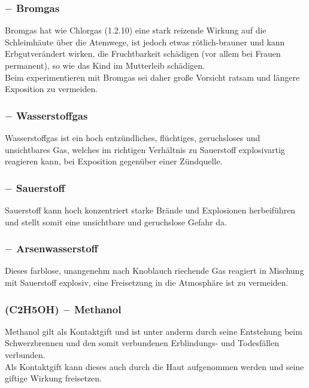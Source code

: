 \documentclass{article}
\begin{document}
\subsubsection{ $-$ Bromgas}
Bromgas hat wie Chlorgas (1.2.10) eine stark reizende Wirkung auf die Schleimhäute über die Atemwege, ist jedoch etwas rötlich-brauner und kann Erbgutverändert wirken, die Fruchtbarkeit schädigen (vor allem bei Frauen permanent), so wie das Kind im Mutterleib schädigen.\\
Beim experimentieren mit Bromgas sei daher große Vorsicht ratsam und längere Exposition zu vermeiden.\\

\subsubsection{ $-$ Wasserstoffgas}
Wasserstoffgas ist ein hoch entzündliches, flüchtiges, geruchsloses und unsichtbares Gas, welches im richtigen Verhältnis zu Sauerstoff explosivartig reagieren kann, bei Exposition gegenüber einer Zündquelle.\\

\subsubsection{ $-$ Sauerstoff}
Sauerstoff kann hoch konzentriert starke Brände und Explosionen herbeiführen und stellt somit eine unsichtbare und geruchslose Gefahr da.\\

\subsubsection{ $-$ Arsenwasserstoff}
Dieses farblose, unangenehm nach Knoblauch riechende Gas reagiert in Mischung mit Sauerstoff explosiv, eine Freisetzung in die Atmosphäre ist zu vermeiden.\\

\subsubsection{\ce(C2H5OH) $-$ Methanol}
Methanol gilt als Kontaktgift und ist unter anderm durch seine Entstehung beim Schwerzbrennen und den somit verbundenen Erblindungs- und Todesfällen verbunden.\\
Als Kontaktgift kann dieses auch durch die Haut aufgenommen werden und seine giftige Wirkung freisetzen.
\end{document}

